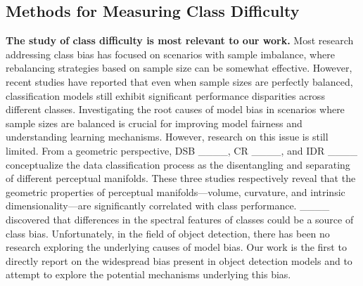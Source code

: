 \vspace{-3mm}
\subsection{Methods for Measuring Class Difficulty}
\label{sec2.2}
\vspace{-3mm}

\textbf{The study of class difficulty is most relevant to our work.} Most research addressing class bias has focused on scenarios with sample imbalance, where rebalancing strategies based on sample size can be somewhat effective. However, recent studies have reported that even when sample sizes are perfectly balanced, classification models still exhibit significant performance disparities across different classes. Investigating the root causes of model bias in scenarios where sample sizes are balanced is crucial for improving model fairness and understanding learning mechanisms. However, research on this issue is still limited. From a geometric perspective, DSB ____, CR ____, and IDR ____ conceptualize the data classification process as the disentangling and separating of different perceptual manifolds. These three studies respectively reveal that the geometric properties of perceptual manifolds—volume, curvature, and intrinsic dimensionality—are significantly correlated with class performance. ____ discovered that differences in the spectral features of classes could be a source of class bias. Unfortunately, in the field of object detection, there has been no research exploring the underlying causes of model bias.
Our work is the first to directly report on the widespread bias present in object detection models and to attempt to explore the potential mechanisms underlying this bias.

\vspace{-2mm}